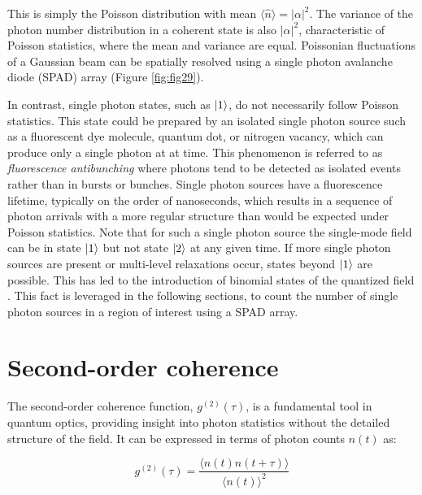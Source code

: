 This is simply the Poisson distribution with mean $\langle \hat{n} \rangle = \lvert\alpha\lvert^2$. The variance of the photon number distribution in a coherent state is also $\lvert\alpha\lvert^2$, characteristic of Poisson statistics, where the mean and variance are equal. Poissonian fluctuations of a Gaussian beam can be spatially resolved using a single photon avalanche diode (SPAD) array (Figure \ref{fig:fig29}).

In contrast, single photon states, such as $\ket{1}$, do not necessarily follow Poisson statistics. This state could be prepared by an isolated single photon source such as a fluorescent dye molecule, quantum dot, or nitrogen vacancy, which can produce only a single photon at at time. This phenomenon is referred to as \emph{fluorescence antibunching} where photons tend to be detected as isolated events rather than in bursts or bunches. Single photon sources have a fluorescence lifetime, typically on the order of nanoseconds, which results in a sequence of photon arrivals with a more regular structure than would be expected under Poisson statistics. Note that for such a single photon source the single-mode field can be in state $\ket{1}$ but not state $\ket{2}$ at any given time. If more single photon sources are present or multi-level relaxations occur, states beyond $\ket{1}$ are possible. This has led to the introduction of binomial states of the quantized field \parencite{Stoler1985}. This fact is leveraged in the following sections, to count the number of single photon sources in a region of interest using a SPAD array.

\section{Second-order coherence}

The second-order coherence function, $ g^{(2)}(\tau) $, is a fundamental tool in quantum optics, providing insight into photon statistics without the detailed structure of the field. It can be expressed in terms of photon counts $ n(t) $ as:

\begin{equation}
g^{(2)}(\tau) = \frac{\langle n(t) n(t+\tau) \rangle}{\langle n(t) \rangle^2}
\end{equation}

